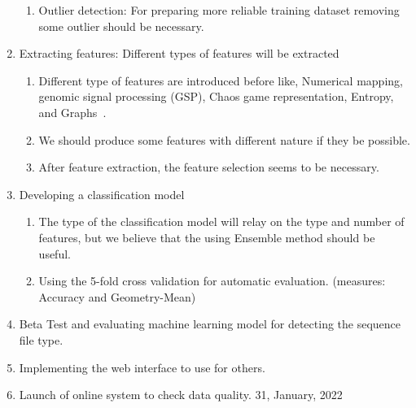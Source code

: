 \documentclass[a4paper]{article}
\newcommand{\deadline}[1]{{\color{blue} \hfill{#1} }}
\begin{document}
\begin{enumerate}
\begin{enumerate}
            \item Outlier detection: For preparing more reliable training dataset removing some outlier should be necessary.
        \end{enumerate} 
        \item Extracting features: Different types of features will be extracted
        \begin{enumerate}
            \item Different type of features are introduced before like, Numerical mapping, genomic signal processing (GSP), Chaos game representation, Entropy, and Graphs~\cite{RF101}.
            \item We should produce some features with different nature if they be possible.
            \item After feature extraction, the feature selection seems to be necessary.
        \end{enumerate}
        \item Developing a classification model
        \begin{enumerate}
            \item The type of the classification model will relay on the type and number of features, but we believe that the using Ensemble method should be useful.
            \item Using the 5-fold cross validation for automatic evaluation. (measures: Accuracy and Geometry-Mean)
        \end{enumerate}
        \item Beta Test and evaluating machine learning model for detecting the sequence file type.
        \begin{}
        \end{}
        \item Implementing the web interface to use for others.
        \item Launch of online system to check data quality. \deadline{31, January, 2022}
    \end{enumerate}

    
    
\end{document}
